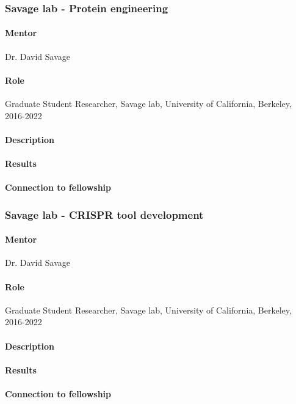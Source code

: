 \documentclass[11pt]{article}
\begin{document}
\subsubsection{Savage lab - Protein engineering}
%
\paragraph{Mentor}
Dr. David Savage
%
\paragraph{Role}
Graduate Student Researcher, Savage lab, University of California, Berkeley, 2016-2022
%
\paragraph{Description}
%
\paragraph{Results}
%
\paragraph{Connection to fellowship}
%
\subsubsection{Savage lab - CRISPR tool development}
\begin{refsection}
%
\paragraph{Mentor}
Dr. David Savage
%
\paragraph{Role}
Graduate Student Researcher, Savage lab, University of California, Berkeley, 2016-2022
%
\paragraph{Description}
%
\paragraph{Results}
%
\paragraph{Connection to fellowship}
%
\nocite{Liu2019-nk,Liu2021-pu}
\printbibliography[heading=none]
\end{refsection}
%
\end{document}
